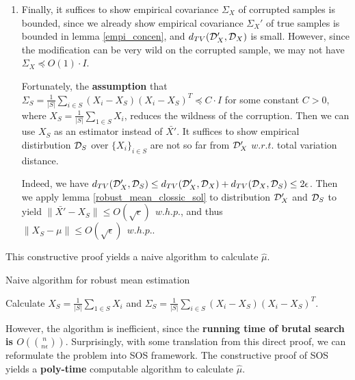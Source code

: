{\begin{enumerate}
    \item Finally, it suffices to show empirical covariance $\Sigma_X$ of corrupted samples is bounded, since we already show empirical covariance $\Sigma_X'$ of true samples is bounded in lemma \ref{empi_concen}, and $d_{TV}(\mathcal{D}_X', \mathcal{D}_X)$ is small. 
    However, since the modification can be very wild on the corrupted sample, we may not have $\Sigma_X\preccurlyeq O(1)\cdot I$. 
    
    Fortunately, the \textbf{assumption} that $\Sigma_S=\frac{1}{|S|}\sum_{i\in S}\left(X_i-X_S\right)\left(X_i-X_S\right)^T\preccurlyeq C\cdot I$ for some constant $C>0$, 
    where $X_S=\frac{1}{|S|}\sum_{1\in S}X_i$, reduces the wildness of the corruption.  Then we can use $X_S$ as an estimator instead of $\bar{X'}$. It suffices to show empirical distirbution $\mathcal{D}_S$ over $\{X_i\}_{i\in S}$ are not so far from $\mathcal{D}_X'$ $w.r.t.$ total variation distance.

    Indeed, we have $d_{TV}(\mathcal{D}_X',\mathcal{D}_S)\le d_{TV}(\mathcal{D}_X',\mathcal{D}_X) + d_{TV}(\mathcal{D}_X,\mathcal{D}_S)\le 2\epsilon$. Then we apply lemma \ref{robust_mean_clossic_sol} to distribution $\mathcal{D}_X'$ and $\mathcal{D}_S$ to yield
    $\|\bar{X'}-X_S\|\le O(\sqrt{\epsilon})~~w.h.p.$, and thus $\|X_S-\mu\|\le O(\sqrt{\epsilon})~~w.h.p.$.


\end{enumerate}
}

This constructive proof yields a naive algorithm to calculate $\hat{\mu}$.
\bigskip
\begin{breakablealgorithm}
    \caption{Naive algorithm for robust mean estimation}
    \label{ineff_robu_mean_est}
    \begin{algorithmic}[1]
        \State Calculate $X_S=\frac{1}{|S|}\sum_{1\in S}X_i$ 
            and $\Sigma_S=\frac{1}{|S|}\sum_{i\in S}(X_i-X_S)(X_i-X_S)^T$.
        \EndIf
    \EndFor
    \end{algorithmic}
\end{breakablealgorithm}

\bigskip
However, the algorithm is inefficient, since the \textbf{running time of brutal search is $O(\binom{n}{n\epsilon})$}.
Surprisingly, with some translation from this direct proof, we can reformulate the problem into SOS framework. The constructive proof of SOS yields a \textbf{poly-time} computable algorithm to calculate $\hat{\mu}$.

